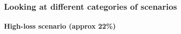 \begin{frame}

    \frametitle{Looking at different categories of scenarios}
    \framesubtitle{High-loss scenario (approx 22\%)}

    \begin{overprint}
        \uncover<+->{}
    \end{overprint}

\end{frame}


